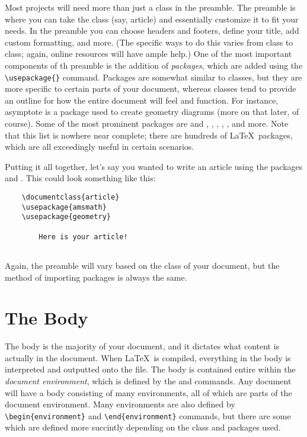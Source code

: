 Most projects will need more than just a class in the preamble. The preamble is where you can take the class (say, article) and essentially customize it to fit your needs. In the preamble you can choose headers and footers, define your title, add custom formatting, and more. (The specific ways to do this varies from class to class; again, online resources will have ample help.) One of the most important components of th preamble is the addition of \emph{packages}, which are added using the \verb|\usepackage{}| command. Packages are somewhat similar to classes, but they are more specific to certain parts of your document, whereas classes tend to provide an outline for how the entire document will feel and function. For instance, asymptote is a package used to create geometry diagrams (more on that later, of course). Some of the most prominent packages are  and , , , , , and more. Note that this list is nowhere near complete; there are hundreds of \LaTeX\ packages, which are all exceedingly useful in certain scenarios. 

Putting it all together, let's say you wanted to write an article using the packages  and . This could look something like this:
\begin{lstlisting}
	\documentclass{article}
	\usepackage{amsmath}
	\usepackage{geometry}
	
		Here is your article!
	
\end{lstlisting}
Again, the preamble will vary based on the class of your document, but the method of importing packages is always the same. 

\section{The Body}
The body is the majority of your document, and it dictates what content is actually in the document. When \LaTeX\ is compiled, everything in the body is interpreted and outputted onto the  file. The body is contained entire within the \emph{document environment}, which is defined by the \verb|| and \verb|| commands. Any document will have a body consisting of many environments, all of which are parts of the document environment. Many environments are also defined by \verb|\begin{environment}| and \verb|\end{environment}| commands, but there are some which are defined more succintly depending on the class and packages used. 

